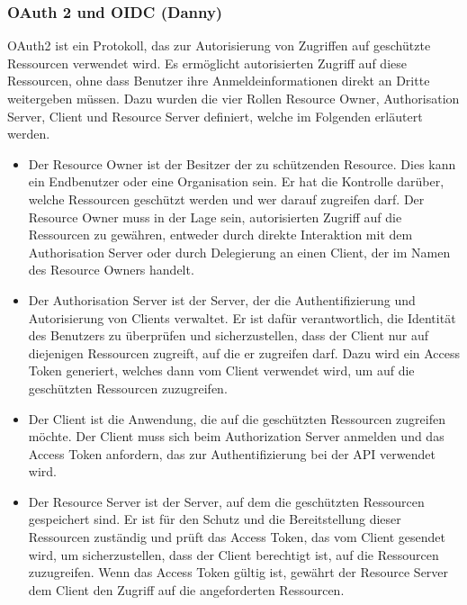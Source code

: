\documentclass[notitlepage, hidelinks]{article}
\begin{document}
\subsubsection{OAuth 2 und OIDC (Danny)}
OAuth2 ist ein Protokoll, das zur Autorisierung von Zugriffen auf geschützte Ressourcen verwendet wird. Es ermöglicht autorisierten Zugriff auf diese Ressourcen, ohne dass Benutzer ihre Anmeldeinformationen direkt an Dritte weitergeben müssen. Dazu wurden die vier Rollen Resource Owner, Authorisation Server, Client und Resource Server definiert, welche im Folgenden erläutert werden. 
\begin{itemize}
\item Der Resource Owner ist der Besitzer der zu schützenden Resource. Dies kann ein Endbenutzer oder eine Organisation sein. Er hat die Kontrolle darüber, welche Ressourcen geschützt werden und wer darauf zugreifen darf. Der Resource Owner muss in der Lage sein, autorisierten Zugriff auf die Ressourcen zu gewähren, entweder durch direkte Interaktion mit dem Authorisation Server oder durch Delegierung an einen Client, der im Namen des Resource Owners handelt. 
\item Der Authorisation Server ist der Server, der die Authentifizierung und Autorisierung von Clients verwaltet. Er ist dafür verantwortlich, die Identität des Benutzers zu überprüfen und sicherzustellen, dass der Client nur auf diejenigen Ressourcen zugreift, auf die er zugreifen darf. Dazu wird ein Access Token generiert, welches dann vom Client verwendet wird, um auf die geschützten Ressourcen zuzugreifen. 
\item Der Client ist die Anwendung, die auf die geschützten Ressourcen zugreifen möchte. Der Client muss sich beim Authorization Server anmelden und das Access Token anfordern, das zur Authentifizierung bei der API verwendet wird. 
\item Der Resource Server ist der Server, auf dem die geschützten Ressourcen gespeichert sind. Er ist für den Schutz und die Bereitstellung dieser Ressourcen zuständig und prüft das Access Token, das vom Client gesendet wird, um sicherzustellen, dass der Client berechtigt ist, auf die Ressourcen zuzugreifen. Wenn das Access Token gültig ist, gewährt der Resource Server dem Client den Zugriff auf die angeforderten Ressourcen.
\end{itemize}
\end{document}
